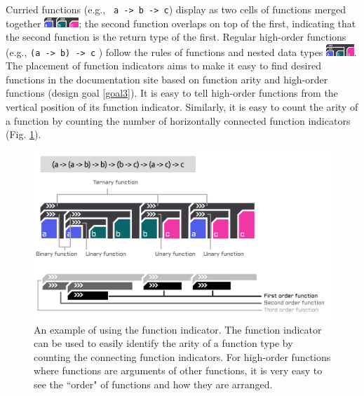 Curried functions (e.g., \texttt{ a -> b -> c}) display as two cells of functions merged together \includegraphics[height=1em]{figures/Curry.png}; the second function overlaps on top of the first, indicating that the second function is the return type of the first. Regular high-order functions (e.g., \texttt{(a -> b) -> c} ) follow the rules of functions and nested data types \includegraphics[height=1.2em]{figures/HOF.png}. The placement of function indicators aims to make it easy to find desired functions in the documentation site based on function arity and high-order functions (design goal \ref{goal3}). It is easy to tell high-order functions from the vertical position of its function indicator. Similarly, it is easy to count the arity of a function by counting the number of horizontally connected function indicators (Fig. \ref{fig:indicator}). 

\begin{figure}[hbt]
  \includegraphics[width=\linewidth]{figures/Indicator}
  \caption[An example of using the function indicator in GeckoGraph]{
        \label{fig:indicator}
        An example of using the function indicator. The function indicator can be used to easily identify the arity of a function type by counting the connecting function indicators. For high-order functions where functions are arguments of other functions, it is very easy to see the ``order" of functions and how they are arranged. 
  }
\end{figure}


 
